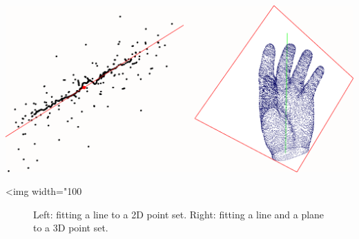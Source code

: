 \begin{center}
    \label{fit}
    \begin{ccTexOnly}
      \includegraphics[width=1.0\textwidth]{Principal_component_analysis/fit}
    \end{ccTexOnly}
    \begin{ccHtmlOnly}
        <img width="100%
    \end{ccHtmlOnly}
    \begin{figure}[h]
        \caption{Left: fitting a line to a 2D point set.
                 Right: fitting a line and a plane to a 3D point set.}
    \end{figure}
\end{center}

